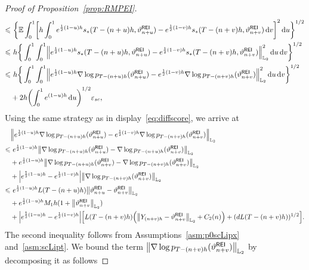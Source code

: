 \begin{proof}[Proof of Proposition~\ref{prop:RMPEI}]
\begin{align*}
    \leqslant &\,\,\bigg\{\mathbb{E}\int_0^1\left[h\int_0^1e^{\frac{1}{2}(1-u)h}s_*(T-(n+u)h,\vartheta_{n+u}^{\sf REI})-e^{\frac{1}{2}(1-v)h}s_*(T-(n+v)h,\vartheta_{n+v}^{\sf REI})\rmd v\right]^2\rmd u\bigg\}^{1/2}\\
    \leqslant & \,\, h\bigg\{\int_0^1\int_0^1\left\lVert e^{\frac{1}{2}(1-u)h}s_*(T-(n+u)h,\vartheta_{n+u}^{\sf REI})-e^{\frac{1}{2}(1-v)h}s_*(T-(n+v)h,\vartheta_{n+v}^{\sf REI})\right\rVert_{\Ltwo}^2\rmd u\rmd v\bigg\}^{1/2}\\
    \leqslant & \,\, h\bigg\{\int_0^1\int_0^1\left\lVert e^{\frac{1}{2}(1-u)h}\nabla\log p_{T-(n+u)h}(\vartheta_{n+u}^{\sf REI})-e^{\frac{1}{2}(1-v)h}\nabla\log p_{T-(n+v)h}(\vartheta_{n+v}^{\sf REI})\right\rVert_{\Ltwo}^2\rmd u\rmd v\bigg\}^{1/2}\\
    &+2h\left(\int_0^1e^{(1-u)h}\rmd u\right)^{1/2}\varepsilon_{sc},
\end{align*}
Using the same strategy as in display~\eqref{eq:diffscore}, we arrive at
\begin{align*}
    &\left\lVert e^{\frac{1}{2}(1-u)h}\nabla\log p_{T-(n+u)h}(\vartheta_{n+u}^{\sf REI})-e^{\frac{1}{2}(1-v)h}\nabla\log p_{T-(n+v)h}(\vartheta_{n+v}^{\sf REI})\right\rVert_{\Ltwo}\\
    \leqslant &\,\, e^{\frac{1}{2}(1-u)h}\left\lVert \nabla\log p_{T-(n+u)h}(\vartheta_{n+u}^{\sf REI})-\nabla\log p_{T-(n+u)h}(\vartheta_{n+v}^{\sf REI})\right\rVert_{\Ltwo}\\
    &+e^{\frac{1}{2}(1-u)h}\left\lVert \nabla\log p_{T-(n+u)h}(\vartheta_{n+v}^{\sf REI})-\nabla\log p_{T-(n+v)h}(\vartheta_{n+v}^{\sf REI})\right\rVert_{\Ltwo}\\
    &+\left|e^{\frac{1}{2}(1-u)h}-e^{\frac{1}{2}(1-v)h}\right|\left\lVert \nabla\log p_{T-(n+v)h}(\vartheta_{n+v}^{\sf REI})\right\rVert_{\Ltwo}\\
    \leqslant & \,\,e^{\frac{1}{2}(1-u)h}L(T-(n+u)h)\l|\vartheta_{n+u}^{\sf REI}-\vartheta_{n+v}^{\sf REI}\r|_{\Ltwo}\\
    &+e^{\frac{1}{2}(1-u)h}M_1h(1+\l|\vartheta_{n+v}^{\sf REI}\r|_{\Ltwo})\\
    &+\left|e^{\frac{1}{2}(1-u)h}-e^{\frac{1}{2}(1-v)h}\right|\left[L(T-(n+v)h)\left(\l|Y_{(n+v)h}-\vartheta_{n+v}^{\sf REI}\r|_{\Ltwo}+C_2(n)\right)+(dL(T-(n+v)h))^{1/2}\right].
\end{align*}
The second inequality follows from Assumptions~\ref{asm:p0scLipx} and~\ref{asm:scLipt}. 
We bound the term $\left\lVert \nabla\log p_{T-(n+v)h}(\vartheta_{n+v}^{\sf REI})\right\rVert_{\Ltwo}$ by decomposing it as follows

\end{proof}
